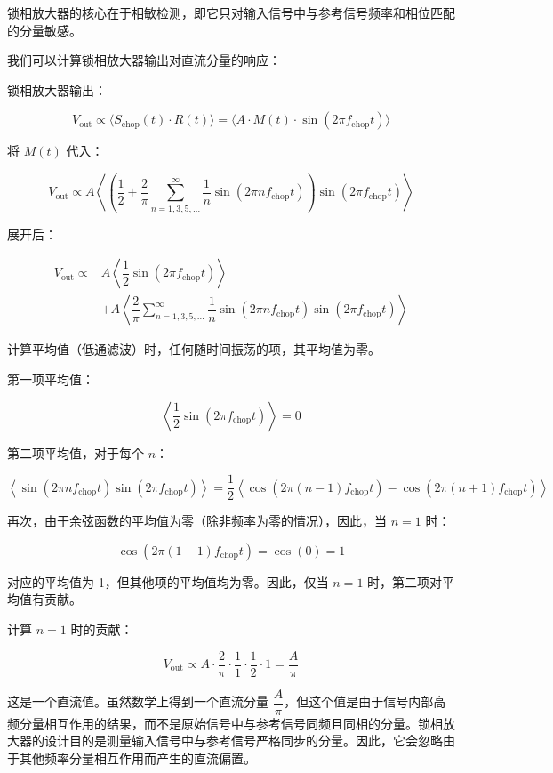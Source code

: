 \documentclass[dvipsnames, svgnames,a4paper,11pt]{article}
\begin{document}
锁相放大器的核心在于相敏检测，即它只对输入信号中与参考信号频率和相位匹配的分量敏感。

我们可以计算锁相放大器输出对直流分量的响应：

锁相放大器输出：

\[
V_{\text{out}} \propto \langle S_{\text{chop}}(t) \cdot R(t) \rangle = \langle A \cdot M(t) \cdot \sin(2\pi f_{\text{chop}} t) \rangle
\]

将 \( M(t) \) 代入：

\[
V_{\text{out}} \propto A \left\langle \left( \dfrac{1}{2} + \dfrac{2}{\pi} \sum_{n=1,3,5,\dots}^{\infty} \dfrac{1}{n} \sin(2\pi n f_{\text{chop}} t) \right) \sin(2\pi f_{\text{chop}} t) \right\rangle
\]

展开后：

\[
\begin{aligned}
	V_{\text{out}} \propto & A \left\langle \dfrac{1}{2} \sin(2\pi f_{\text{chop}} t) \right\rangle \\
	& + A \left\langle \dfrac{2}{\pi} \sum_{n=1,3,5,\dots}^{\infty} \dfrac{1}{n} \sin(2\pi n f_{\text{chop}} t) \sin(2\pi f_{\text{chop}} t) \right\rangle
\end{aligned}
\]

计算平均值（低通滤波）时，任何随时间振荡的项，其平均值为零。

第一项平均值：

\[
\left\langle \dfrac{1}{2} \sin(2\pi f_{\text{chop}} t) \right\rangle = 0
\]

第二项平均值，对于每个 \( n \)：

\[
\left\langle \sin(2\pi n f_{\text{chop}} t) \sin(2\pi f_{\text{chop}} t) \right\rangle = \dfrac{1}{2} \left\langle \cos(2\pi (n - 1) f_{\text{chop}} t) - \cos(2\pi (n + 1) f_{\text{chop}} t) \right\rangle
\]

再次，由于余弦函数的平均值为零（除非频率为零的情况），因此，当 \( n = 1 \) 时：

\[
\cos(2\pi (1 - 1) f_{\text{chop}} t) = \cos(0) = 1
\]

对应的平均值为 1，但其他项的平均值均为零。因此，仅当 \( n = 1 \) 时，第二项对平均值有贡献。

计算 \( n = 1 \) 时的贡献：

\[
V_{\text{out}} \propto A \cdot \dfrac{2}{\pi} \cdot \dfrac{1}{1} \cdot \dfrac{1}{2} \cdot 1 = \dfrac{A}{\pi}
\]

这是一个直流值。虽然数学上得到一个直流分量 \( \dfrac{A}{\pi} \)，但这个值是由于信号内部高频分量相互作用的结果，而不是原始信号中与参考信号同频且同相的分量。锁相放大器的设计目的是测量输入信号中与参考信号严格同步的分量。因此，它会忽略由于其他频率分量相互作用而产生的直流偏置。
\end{document}
